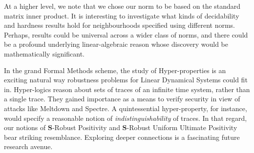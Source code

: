 At a higher level, we note that we chose our norm to be based on the standard matrix inner product. It is interesting to investigate what kinds of decidability and hardness results hold for neighbourhoods specified using different norms. Perhaps, results could be universal across a wider class of norms, and there could be a profound underlying linear-algebraic reason whose discovery would be mathematically significant.

In the grand Formal Methods scheme, the study of Hyper-properties \cite{hyperproperties} is an exciting natural way robustness problems for Linear Dynamical Systems could fit in. Hyper-logics reason about sets of traces of an infinite time system, rather than a single trace. They gained importance as a means to verify security in view of attacks like Meltdown and Spectre. A quintessential hyper-property, for instance, would specify a reasonable notion of \textit{indistinguishability} of traces. In that regard, our notions of $\mathbf{S}$-Robust Positivity and $\mathbf{S}$-Robust Uniform Ultimate Positivity bear striking resemblance. Exploring deeper connections is a fascinating future research avenue.
